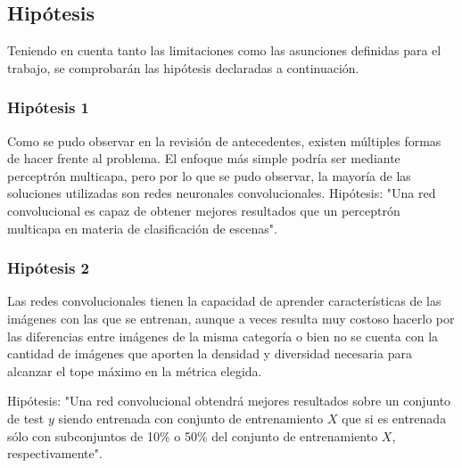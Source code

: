 \subsection{Hipótesis}
Teniendo en cuenta tanto las limitaciones como las asunciones definidas para el trabajo, se comprobarán las hipótesis declaradas a continuación. 

\subsubsection{Hipótesis 1} \label{sssec:hipotesis1}
Como se pudo observar en la revisión de antecedentes, existen múltiples formas de hacer frente al problema. El enfoque más simple podría ser mediante perceptrón multicapa, pero por lo que se pudo observar, la mayoría de las soluciones utilizadas son redes neuronales convolucionales. 
Hipótesis: "Una red convolucional es capaz de obtener mejores resultados que un perceptrón multicapa en materia de clasificación de escenas".

\subsubsection{Hipótesis 2} \label{sssec:hipotesis2}
Las redes convolucionales tienen la capacidad de aprender características de las imágenes con las que se entrenan, aunque a veces resulta muy costoso hacerlo por las diferencias entre imágenes de la misma categoría o bien no se cuenta con la cantidad de imágenes que aporten la densidad y diversidad necesaria para alcanzar el tope máximo en la métrica elegida. 

Hipótesis: "Una red convolucional obtendrá mejores resultados sobre un conjunto de test \(y\) siendo entrenada con conjunto de entrenamiento \(X\) que si es entrenada sólo con subconjuntos de 10\% o 50\% del conjunto de entrenamiento \(X\), respectivamente".



